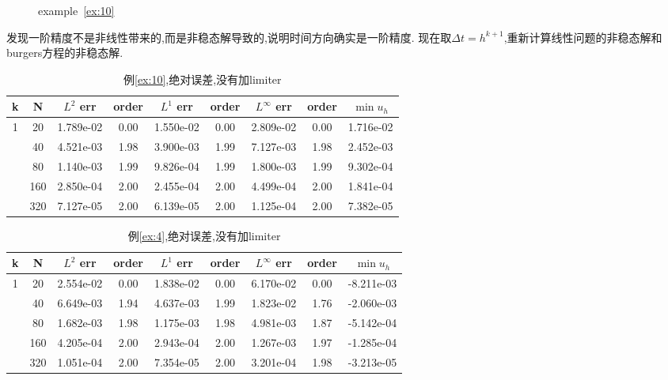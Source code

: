 \documentclass[a4paper, 11pt]{ctexart}
\numberwithin{equation}{section}
\numberwithin{figure}{section}
\begin{document}
\begin{figure}[H]
  \centering
\caption{example~\ref{ex:10}}
\end{figure}
发现一阶精度不是非线性带来的,而是非稳态解导致的,说明时间方向确实是一阶精度.
现在取$\Delta t=h^{k+1}$,重新计算线性问题的非稳态解和burgers方程的非稳态解.

\begin{table}[H]
  \centering
  \begin{tabular}{c|c|c|c|c|c|c|c|c} \toprule
 k  &  N &  $L^2$ err& order&$L^1$ err  &order & $L^\infty$ err&order& $\min u_h$ \\ \midrule
 \multirow{5}{*}{1}  &  20 & 1.789e-02 & 0.00 & 1.550e-02 & 0.00 & 2.809e-02 & 0.00 & 1.716e-02  \\
                     &  40 & 4.521e-03 & 1.98 & 3.900e-03 & 1.99 & 7.127e-03 & 1.98 & 2.452e-03  \\
                     &  80 & 1.140e-03 & 1.99 & 9.826e-04 & 1.99 & 1.800e-03 & 1.99 & 9.302e-04  \\
                     & 160 & 2.850e-04 & 2.00 & 2.455e-04 & 2.00 & 4.499e-04 & 2.00 & 1.841e-04  \\
                     & 320 & 7.127e-05 & 2.00 & 6.139e-05 & 2.00 & 1.125e-04 & 2.00 & 7.382e-05  \\ \midrule
  \end{tabular}
  \caption{例\ref{ex:10},绝对误差,没有加limiter}
\end{table}

\begin{table}[H]
  \centering
  \begin{tabular}{c|c|c|c|c|c|c|c|c} \toprule
 k  &  N &  $L^2$ err& order&$L^1$ err  &order & $L^\infty$ err&order& $\min u_h$ \\ \midrule
 \multirow{5}{*}{1}  &  20 &2.554e-02 &0.00 &1.838e-02 &0.00 &6.170e-02 &0.00 &-8.211e-03 \\
                     &  40 &6.649e-03 &1.94 &4.637e-03 &1.99 &1.823e-02 &1.76 &-2.060e-03 \\
                     &  80 &1.682e-03 &1.98 &1.175e-03 &1.98 &4.981e-03 &1.87 &-5.142e-04 \\
                     & 160 &4.205e-04 &2.00 &2.943e-04 &2.00 &1.267e-03 &1.97 &-1.285e-04 \\
                     & 320 &1.051e-04 &2.00 &7.354e-05 &2.00 &3.201e-04 &1.98 &-3.213e-05 \\ \bottomrule
  \end{tabular}
  \caption{例\ref{ex:4},绝对误差,没有加limiter}
\end{table}
\end{document}
